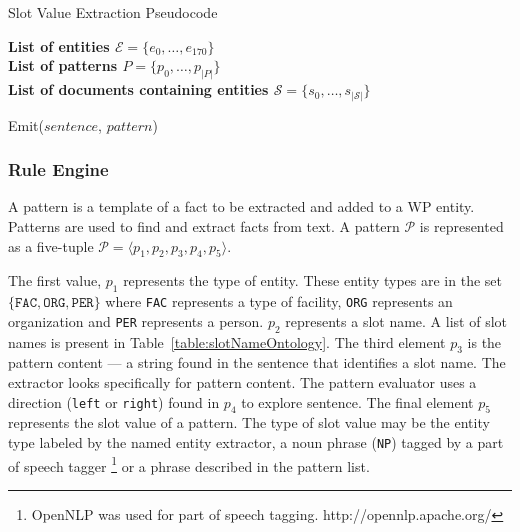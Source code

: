 \documentclass[letterpaper]{article}
\begin{document}
\begin{algorithm}
  \caption{Slot Value Extraction Pseudocode}
  \textbf{List of entities $\mathcal{E} = \{e_0, \ldots, e_{170}\}$}\\
  \textbf{List of patterns $P = \{p_0, \ldots, p_{|P|}\}$}\\
  \textbf{List of documents containing entities $\mathcal{S} = \{s_0, \ldots, s_{|\mathcal{S}|}\}$}\\

  \begin{algorithmic}%
    \STATE Emit($sentence$, $pattern$)
  \ENDIF
\ENDFOR
          \ENDIF
        \ENDFOR
      \ENDFOR
    \ENDFOR
  \end{algorithmic}
\end{algorithm}


\subsubsection{Rule Engine}

A pattern is a template of a fact to be extracted and added to a WP entity.
Patterns are used to find and extract facts from text.
A pattern $\mathcal{P}$ is represented as a five-tuple $\mathcal{P} = \langle p_1, p_2, p_3, p_4, p_5 \rangle$.


The first value, $p_1$ represents the type of entity.
These entity types are in the set
 $ \{ \texttt{FAC}, \texttt{ORG}, \texttt{PER} \}$ 
where \texttt{FAC} represents a type of facility, \texttt{ORG} represents an organization and \texttt{PER} represents a person.
 $p_2$ represents a slot name.
A list of slot names is present in Table~\ref{table:slotNameOntology}.
The third element $p_3$ is the pattern content --- 
a string found in the sentence that identifies a slot name.
The extractor looks specifically for pattern content.
The pattern evaluator uses a direction (\texttt{left} or \texttt{right}) found in $p_4$ to explore sentence.
The final element $p_5$ represents the slot value of a pattern. 
The type of slot value may be the entity type labeled by the named entity extractor,
a noun phrase (\texttt{NP}) tagged by a part of speech tagger
\footnote{OpenNLP was used for part of speech tagging. http://opennlp.apache.org/} or a phrase described in the pattern list.
\end{document}
